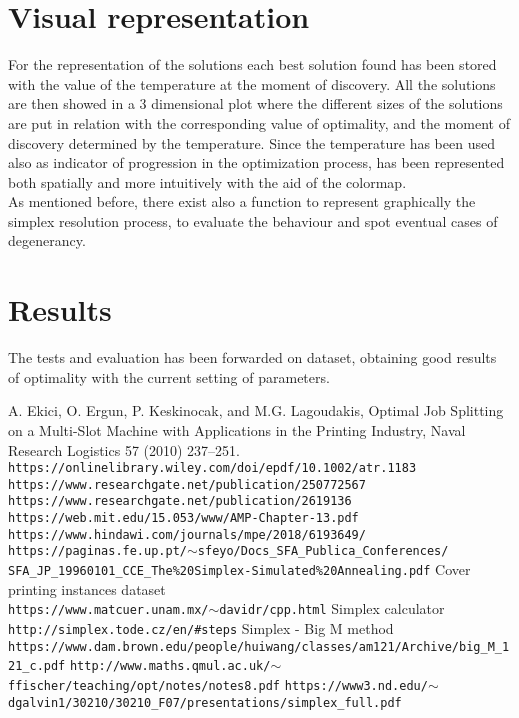 ﻿\documentclass[a4paper]{article}
\begin{document}
\section{Visual representation}
For the representation of the solutions each best solution found has been stored with the value of the temperature at the moment of discovery. All the solutions are then showed in a 3 dimensional plot where the different sizes of the solutions are put in relation with the corresponding value of optimality, and the moment of discovery determined by the temperature. Since the temperature has been used also as indicator of progression in the optimization process, has been represented both spatially and more intuitively with the aid of the colormap.\\
As mentioned before, there exist also a function to represent graphically the simplex resolution process, to evaluate the behaviour and spot eventual cases of degenerancy.

\section{Results}
The tests and evaluation has been forwarded on \cite{cp-dataset} dataset, obtaining good results of optimality with the current setting of parameters.

\newpage
\begin{thebibliography}{}
 A. Ekici, O. Ergun, P. Keskinocak, and M.G. Lagoudakis, Optimal Job Splitting on a Multi-Slot Machine with Applications in the Printing Industry, Naval Research Logistics 57 (2010) 237--251.
 \texttt{https://onlinelibrary.wiley.com/doi/epdf/10.1002/atr.1183}
 \texttt{https://www.researchgate.net/publication/250772567}
 \texttt{https://www.researchgate.net/publication/2619136}
 \texttt{https://web.mit.edu/15.053/www/AMP-Chapter-13.pdf}
 \texttt{https://www.hindawi.com/journals/mpe/2018/6193649/}
 \texttt{https://paginas.fe.up.pt/$\sim$sfeyo/Docs\_SFA\_Publica\_Conferences/\\
SFA\_JP\_19960101\_CCE\_The\%20Simplex-Simulated\%20Annealing.pdf}
 Cover printing instances dataset\\ \texttt{https://www.matcuer.unam.mx/$\sim$davidr/cpp.html}
 Simplex calculator\\
\texttt{http://simplex.tode.cz/en/#steps}
 Simplex - Big M method\\ \texttt{https://www.dam.brown.edu/people/huiwang/classes/am121/Archive/big\_M\_121\_c.pdf}
 \texttt{http://www.maths.qmul.ac.uk/$\sim$ffischer/teaching/opt/notes/notes8.pdf}
 \texttt{https://www3.nd.edu/$\sim$dgalvin1/30210/30210\_F07/presentations/simplex\_full.pdf}
\end{thebibliography}
\end{document}
